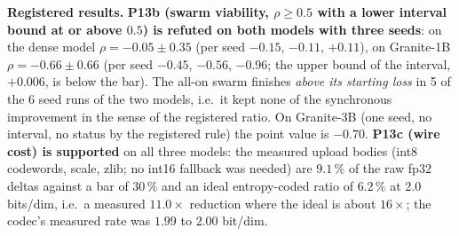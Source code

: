 \documentclass[11pt,a4paper]{article}
\begin{document}
\textbf{Registered results.} \textbf{P13b (swarm viability, $\rho\ge0.5$ with a lower interval bound at or above $0.5$) is refuted on both models with three seeds}: on the dense model $\rho = -0.05 \pm 0.35$ (per seed $-0.15$, $-0.11$, $+0.11$), on Granite-1B $\rho = -0.66 \pm 0.66$ (per seed $-0.45$, $-0.56$, $-0.96$; the upper bound of the interval, $+0.006$, is below the bar). The all-on swarm finishes \emph{above its starting loss} in 5 of the 6 seed runs of the two models, i.e.\ it kept none of the synchronous improvement in the sense of the registered ratio. On Granite-3B (one seed, no interval, no status by the registered rule) the point value is $-0.70$. \textbf{P13c (wire cost) is supported} on all three models: the measured upload bodies (int8 codewords, scale, zlib; no int16 fallback was needed) are $9.1\,\%$ of the raw fp32 deltas against a bar of $30\,\%$ and an ideal entropy-coded ratio of $6.2\,\%$ at $2.0$ bits/dim, i.e.\ a measured $11.0\times$ reduction where the ideal is about $16\times$; the codec's measured rate was $1.99$ to $2.00$ bit/dim.

\begin{table}[ht!]
\centering
\caption{E13 P13d (descriptive, no status): each mechanism removed from the all-on cell, \texttt{Qwen2.5-0.5B}, $M=4$, three seeds. ``Late discards'' counts deltas that arrived outside the grace window, summed over the three seeds. The paired difference $L(\mathrm{S2})-L(\mathrm{S}x)$ is positive when removing the mechanism lowers the held-out loss.}
\label{tab:e13_mech}
\vspace{0.35em}
\end{table}
\end{document}
